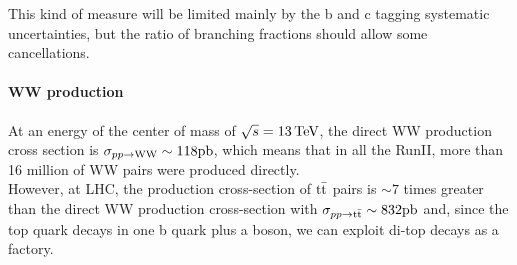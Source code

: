 This kind of measure will be limited mainly by the b and c tagging systematic uncertainties, but the ratio of branching fractions should allow some cancellations.
\paragraph*{WW production}
At an energy of the center of mass of $\sqrt{s}=13 {\,\text{Te\hspace{-.08em}V}}$, the direct WW production cross section is $\sigma_{pp\to{\ensuremath{\text{W}}}{\ensuremath{\text{W}}}}\sim118 \text{pb}$, which means that in all the RunII, more than 16 million of WW pairs were produced directly.\\
However, at LHC, the production cross-section of ${{\text{t}}{\bar{\text{t}}}}$ pairs is $\sim 7$ times greater than the direct WW production cross-section with $\sigma_{pp\to {\ensuremath{{\text{t}}{\bar{\text{t}}}}}}\sim832\text{pb}$ and, since the top quark decays in one b quark plus a \PW boson, we can exploit di-top decays as a \PW\PW factory.
